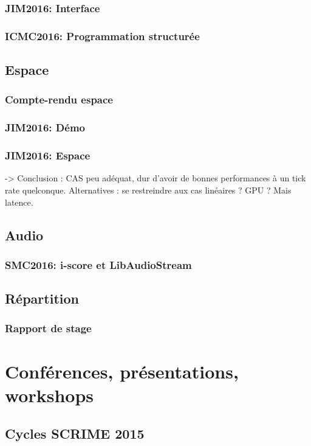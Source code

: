 \documentclass[french,a4paper]{book}
\begin{document}
\subsubsection{JIM2016: Interface}
\subsubsection{ICMC2016: Programmation structurée}

\subsection{Espace}
\subsubsection{Compte-rendu espace}

\subsubsection{JIM2016: Démo}
\subsubsection{JIM2016: Espace}
-> Conclusion : CAS peu adéquat, dur d'avoir de bonnes performances à un tick rate quelconque.
Alternatives : se restreindre aux cas linéaires ? 
GPU ? Mais latence.


\subsection{Audio}
\subsubsection{SMC2016: i-score et LibAudioStream}

\subsection{Répartition}
\subsubsection{Rapport de stage}

\section{Conférences, présentations, workshops}
\subsection{Cycles SCRIME 2015}
\end{document}

